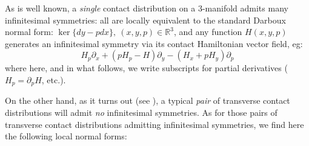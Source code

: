 \documentclass[10pt]{amsart}
\newcommand{\R}{\mathbb{R}}
\newcommand{\del}{\partial}
\theoremstyle{definition}
\begin{document}
As is well known, a {\em single} contact distribution on a 3-manifold admits many infinitesimal symmetries: all are locally equivalent to the standard Darboux normal form: $\ker\{dy - pdx\}, ~(x,y,p)\in \R^3$, and any function $H(x,y,p)$ generates an infinitesimal symmetry via its contact Hamiltonian vector field, eg:
\begin{equation}\label{eq:ContHamVf}
    H_p\del_x + (p H_p - H  )\del_y - (H_x + p H_y)\del_p 
\end{equation} 
where here, and in what follows, we write subscripts for partial derivatives ($H_p = \del_p H$, etc.).

On the other hand, as it turns out (see \cite{Wilk}), a typical {\em pair} of transverse contact distributions will admit {\em no} infinitesimal symmetries. As for those pairs of transverse contact distributions admitting infinitesimal symmetries, we find here the following local normal forms:
\end{document}
